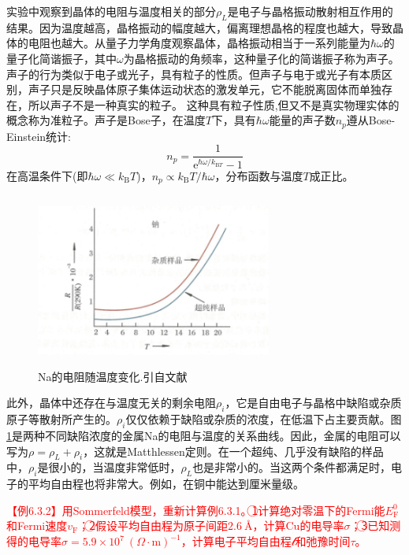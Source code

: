 实验中观察到晶体的电阻与温度相关的部分$\rho_L$是电子与晶格振动散射相互作用的结果。因为温度越高，晶格振动的幅度越大，偏离理想晶格的程度也越大，导致晶体的电阻也越大。从量子力学角度观察晶体，晶格振动相当于一系列能量为$\hbar\omega$的量子化简谐振子，其中$\omega$为晶格振动的角频率，这种量子化的简谐振子称为声子。声子的行为类似于电子或光子，具有粒子的性质。但声子与电于或光子有本质区别，声子只是反映晶体原子集体运动状态的激发单元，它不能脱离固体而单独存在，所以声子不是一种真实的粒子。%
这种具有粒子性质,但又不是真实物理实体的概念称为准粒子。声子是Bose子，在温度$T$下，具有$\hbar\omega$能量的声子数$n_p$遵从Bose-Einstein统计:
\begin{equation}
	n_p=\dfrac1{\mathrm{e}^{\hbar\omega/k_{\mathrm{B}T}}-1}
	\label{eq:Bose-Einstein}
\end{equation}
在高温条件下(即$\hbar\omega\ll k_{\mathrm{B}}T$)，$n_p\propto k_{\mathrm{B}}T/\hbar\omega$，分布函数与温度$T$成正比。
\begin{figure}[h!]
\centering
\vspace*{-0.10in}
\includegraphics[height=2.25in,width=3.05in,viewport=0 0 70 50,clip]{Figures/Na_Resistity-Temperature.png}
\caption{\small \textrm{Na的电阻随温度变化.引自文献}}%
\label{Fig:Na-Resistity}
\end{figure}

此外，晶体中还存在与温度无关的剩余电阻$\rho_i$，它是自由电子与晶格中缺陷或杂质原子等散射所产生的。$\rho_i$仅仅依赖于缺陷或杂质的浓度，在低温下占主要贡献。图\ref{Fig:Na-Resistity}是两种不同缺陷浓度的金属Na的电阻与温度的关系曲线。因此，金属的电阻可以写为$\rho=\rho_L+\rho_i$，这就是Matthlessen定则。在一个超纯、几乎没有缺陷的样品中，$\rho_i$是很小的，当温度非常低时，$\rho_L$也是非常小的。当这两个条件都满足时，电子的平均自由程也将非常大。例如，在铜中能达到厘米量级。

\textcolor{red}{【例6.3.2】用Sommerfeld模型，重新计算例6.3.1。\textcircled{1}计算绝对零温下的Fermi能$E_{\mathrm{F}}^0$和Fermi速度$v_{\mathrm{F}}$；\textcircled{2}假设平均自由程为原子间距$2.6~\mbox{\AA}$，计算Cu的电导率$\sigma$；\textcircled{3}已知测得的电导率$\sigma=5.9\times10^{7}~(\Omega\cdot\mathrm{m})^{-1}$，计算电子平均自由程$\mathscr{l}$和弛豫时间$\tau$。}

